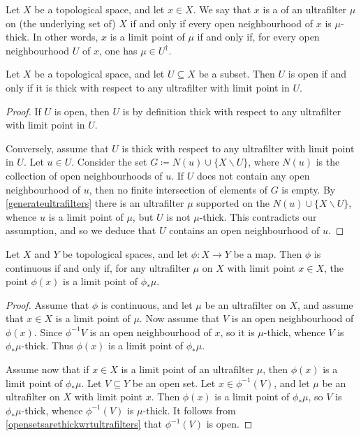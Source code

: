 \begin{definition} \label{limitpointofultrafilter}
	Let $ X $ be a topological space, and let $ x \in X $.
	We say that $ x $ is a  of an ultrafilter $ \mu $ on (the underlying set of) $ X $ if and only if every open neighbourhood of $ x $ is $ \mu $-thick.
	In other words, $ x $ is a limit point of $ \mu $ if and only if, for every open neighbourhood $ U $ of $ x $, one has $ \mu \in U^{\dag} $.
\end{definition}

\begin{lemma} \label{opensetsarethickwrtultrafilters}
	Let $ X $ be a topological space, and let $ U \subseteq X$ be a subset.
	Then $ U $ is open if and only if it is thick with respect to any ultrafilter with limit point in $ U $.
\end{lemma}

\begin{proof}
	If $ U $ is open, then $ U $ is by definition thick with respect to any ultrafilter with limit point in $ U $.

	Conversely, assume that $ U $ is thick with respect to any ultrafilter with limit point in $ U $.
	Let $ u \in U $.
	Consider the set $ G \coloneq N(u) \cup \{ X \smallsetminus U \} $, where $N(u)$ is the collection of open neighbourhoods of $u$.
	If $ U $ does not contain any open neighbourhood of $u$, then no finite intersection of elements of $ G $ is empty.
	By \ref{generateultrafilters} there is an ultrafilter $ \mu $ supported on the $ N(u) \cup \{ X \smallsetminus U \} $, whence $ u $ is a limit point of $ \mu $, but $ U $ is not $ \mu $-thick.
	This contradicts our assumption, and so we deduce that $ U $ contains an open neighbourhood of $ u $.
\end{proof}

\begin{lemma} \label{continuityviaultrafilters}
	Let $ X $ and $ Y $ be topological spaces, and let $ \phi \colon X \to Y $ be a map.
	Then $ \phi $ is continuous if and only if, for any ultrafilter $ \mu $ on $ X $ with limit point $ x \in X $, the point $ \phi(x) $ is a limit point of $ \phi_{\ast}\mu $.
\end{lemma}

\begin{proof}
	Assume that $ \phi $ is continuous, and let $ \mu $ be an ultrafilter on $ X $, and assume that $ x \in X $ is a limit point of  $ \mu $.
	Now assume that $ V $ is an open neighbourhood of $ \phi(x) $.
	Since $ \phi^{-1}V $ is an open neighbourhood of $ x $, so it is $ \mu $-thick, whence $ V $ is $\phi_{\ast}\mu$-thick.
	Thus $ \phi(x) $ is a limit point of $ \phi_{\ast}\mu $.

	Assume now that if $ x \in X $ is a limit point of an ultrafilter $ \mu $, then $ \phi(x) $ is a limit point of $ \phi_{\ast}\mu $.
	Let $ V \subseteq Y $ be an open set.
	Let $ x \in \phi^{-1}(V) $, and let $ \mu $ be an ultrafilter on $ X $ with limit point $ x $.
	Then $ \phi(x) $ is a limit point of $ \phi_{\ast}\mu $, so $V$ is $ \phi_{\ast}\mu $-thick, whence $ \phi^{-1}(V) $ is $ \mu $-thick.
	It follows from \ref{opensetsarethickwrtultrafilters} that $\phi^{-1}(V)$ is open.
\end{proof}

